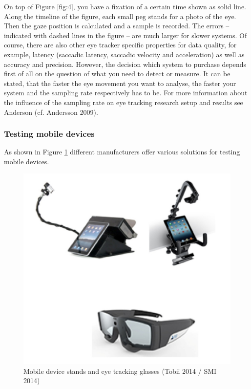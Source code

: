 \documentclass[output=paper]{langsci/langscibook}
\begin{document}
On top of Figure \ref{fig:4}, you have a fixation of a certain time shown as solid line. Along the timeline of the figure, each small peg stands for a photo of the eye. Then the gaze position is calculated and a sample is recorded. The errors – indicated with dashed lines in the figure – are much larger for slower systems. Of course, there are also other eye tracker specific properties for data quality, for example, latency (saccadic latency, saccadic velocity and acceleration) as well as accuracy and precision. However, the decision which system to purchase depends first of all on the question of what you need to detect or measure. It can be stated, that the faster the eye movement you want to analyse, the faster your system and the sampling rate respectively has to be. For more information about the influence of the sampling rate on eye tracking research setup and results see Anderson (cf. Andersson 2009). 

\subsubsection{Testing mobile devices}

As shown in Figure \ref{fig:5} different manufacturers offer various solutions for testing mobile devices. 

\begin{figure}
 \includegraphics[width=\textwidth]{figures/Roesener5.png}
 \caption{Mobile device stands and eye tracking glasses (Tobii 2014 / SMI 2014)}
 \label{fig:5}
\end{figure} 
\end{document}
